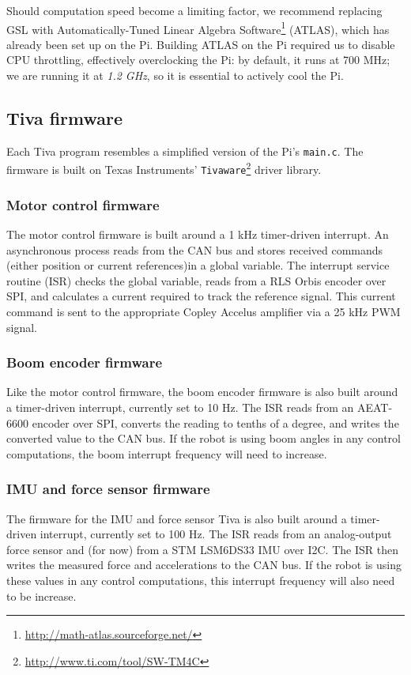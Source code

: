\documentclass{report}
\begin{document}
Should computation speed become a limiting factor, we recommend replacing GSL with Automatically-Tuned Linear Algebra Software\footnote{\url{http://math-atlas.sourceforge.net/}} (ATLAS), which has already been set up on the Pi. Building ATLAS on the Pi required us to disable CPU throttling, effectively overclocking the Pi: by default, it runs at 700 MHz; we are running it at \textit{1.2 GHz}, so it is essential to actively cool the Pi.

\subsection[Tiva firmware]{Tiva firmware}
Each Tiva program resembles a simplified version of the Pi's \texttt{main.c}. The firmware is built on Texas Instruments' \texttt{Tivaware}\footnote{\url{http://www.ti.com/tool/SW-TM4C}} driver library.
\subsubsection[Motor control firmware]{Motor control firmware}
The motor control firmware is built around a 1 kHz timer-driven interrupt. An asynchronous process reads from the CAN bus and stores received commands (either position or current references)in a global variable. The interrupt service routine (ISR) checks the global variable, reads from a RLS Orbis encoder over SPI, and calculates a current required to track the reference signal. This current command is sent to the appropriate Copley Accelus amplifier via a 25 kHz PWM signal.
\subsubsection[Boom encoder firmware]{Boom encoder firmware}
Like the motor control firmware, the boom encoder firmware is also built around a timer-driven interrupt, currently set to 10 Hz. The ISR reads from an AEAT-6600 encoder over SPI, converts the reading to tenths of a degree, and writes the converted value to the CAN bus. If the robot is using boom angles in any control computations, the boom interrupt frequency will need to increase.
\subsubsection[IMU and force sensor firmware]{IMU and force sensor firmware}
The firmware for the IMU and force sensor Tiva is also built around a timer-driven interrupt, currently set to 100 Hz. The ISR reads from an analog-output force sensor and (for now) from a STM LSM6DS33 IMU over I2C. The ISR then writes the measured force and accelerations to the CAN bus. If the robot is using these values in any control computations, this interrupt frequency will also need to be increase.
\end{document}
